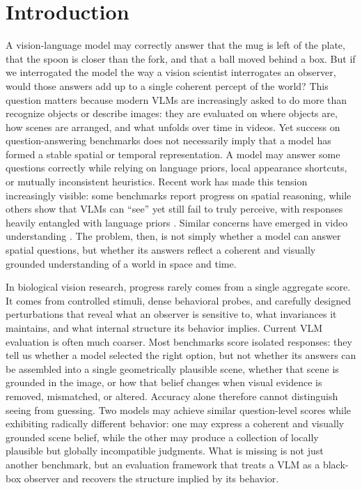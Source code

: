 \section{Introduction}

A vision-language model may correctly answer that the mug is left of the plate, that the spoon is closer than the fork, and that a ball moved behind a box. But if we interrogated the model the way a vision scientist interrogates an observer, would those answers add up to a single coherent percept of the world? This question matters because modern VLMs are increasingly asked to do more than recognize objects or describe images: they are evaluated on where objects are, how scenes are arranged, and what unfolds over time in videos. Yet success on question-answering benchmarks does not necessarily imply that a model has formed a stable spatial or temporal representation. A model may answer some questions correctly while relying on language priors, local appearance shortcuts, or mutually inconsistent heuristics. Recent work has made this tension increasingly visible: some benchmarks report progress on spatial reasoning, while others show that VLMs can ``see'' yet still fail to truly perceive, with responses heavily entangled with language priors \cite{chen2024spatialvlm,fu2024blink,chen2024mmstar,lee2025vlind}. Similar concerns have emerged in video understanding \cite{fu2024videomme,zhou2024mlvu,liu2024tempcompass,zhou2025vlm4d}. The problem, then, is not simply whether a model can answer spatial questions, but whether its answers reflect a coherent and visually grounded understanding of a world in space and time.

In biological vision research, progress rarely comes from a single aggregate score. It comes from controlled stimuli, dense behavioral probes, and carefully designed perturbations that reveal what an observer is sensitive to, what invariances it maintains, and what internal structure its behavior implies. Current VLM evaluation is often much coarser. Most benchmarks score isolated responses: they tell us whether a model selected the right option, but not whether its answers can be assembled into a single geometrically plausible scene, whether that scene is grounded in the image, or how that belief changes when visual evidence is removed, mismatched, or altered. Accuracy alone therefore cannot distinguish seeing from guessing. Two models may achieve similar question-level scores while exhibiting radically different behavior: one may express a coherent and visually grounded scene belief, while the other may produce a collection of locally plausible but globally incompatible judgments. What is missing is not just another benchmark, but an evaluation framework that treats a VLM as a black-box observer and recovers the structure implied by its behavior.

